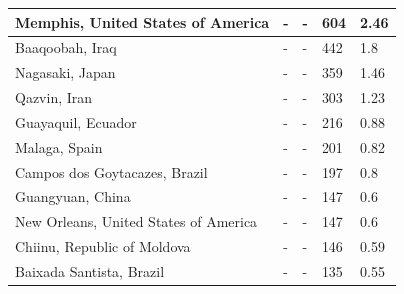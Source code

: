 \documentclass[final,3p,times,authoryear]{elsarticle}
\begin{document}
\begin{table}[!htbp]
\begin{tabular}{| l | l |l| l | l|}
Memphis, United States of America &-&- & 604 & 2.46\\ \hline
Baaqoobah, Iraq &-&- & 442 & 1.8\\ \hline
Nagasaki, Japan &-&- & 359 & 1.46\\ \hline
Qazvin, Iran &-&- & 303 & 1.23\\ \hline
Guayaquil, Ecuador &-&- & 216 & 0.88\\ \hline
Malaga, Spain &-&- & 201 & 0.82\\ \hline
Campos dos Goytacazes, Brazil &-&- & 197 & 0.8\\ \hline
Guangyuan, China &-&- & 147 & 0.6\\ \hline
New Orleans, United States of America &-&- & 147 & 0.6\\ \hline
Chiinu, Republic of Moldova &-&- & 146 & 0.59\\ \hline
Baixada Santista, Brazil &-&- & 135 & 0.55\\ \hline
\end{tabular}
\end{table}
\end{document}
